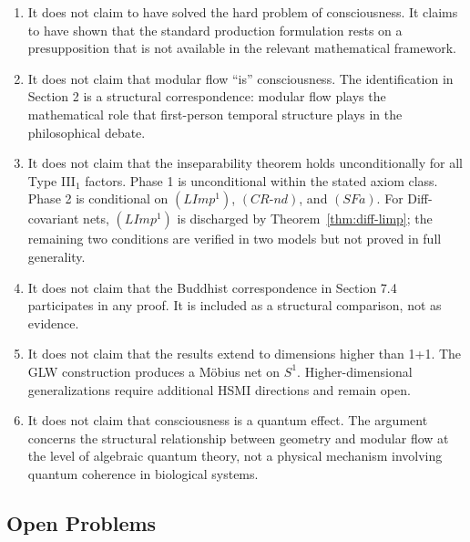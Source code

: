 \documentclass[12pt]{article}
\theoremstyle{definition}
\theoremstyle{remark}
\begin{document}
\begin{enumerate}
\def\labelenumi{\arabic{enumi}.}
\item
  It does not claim to have solved the hard problem of consciousness. It
  claims to have shown that the standard production formulation rests on
  a presupposition that is not available in the relevant mathematical
  framework.
\item
  It does not claim that modular flow ``is'' consciousness. The
  identification in Section 2 is a structural correspondence: modular
  flow plays the mathematical role that first-person temporal structure
  plays in the philosophical debate.
\item
  It does not claim that the inseparability theorem holds
  unconditionally for all Type III\(_1\) factors. Phase 1 is
  unconditional within the stated axiom class. Phase 2 is conditional on
  \((LImp^1)\), \((CR\text{-}nd)\), and \((SFa)\). For Diff-covariant nets,
  \((LImp^1)\) is discharged by Theorem~\ref{thm:diff-limp}; the remaining
  two conditions are verified in two models but not proved in full generality.
\item
  It does not claim that the Buddhist correspondence in Section 7.4
  participates in any proof. It is included as a structural comparison,
  not as evidence.
\item
  It does not claim that the results extend to dimensions higher than
  1+1. The GLW construction produces a Möbius net on \(S^1\).
  Higher-dimensional generalizations require additional HSMI directions
  and remain open.
\item
  It does not claim that consciousness is a quantum effect. The argument
  concerns the structural relationship between geometry and modular flow
  at the level of algebraic quantum theory, not a physical mechanism
  involving quantum coherence in biological systems.
\end{enumerate}

\subsection{Open Problems}\label{open-problems}
\end{document}
